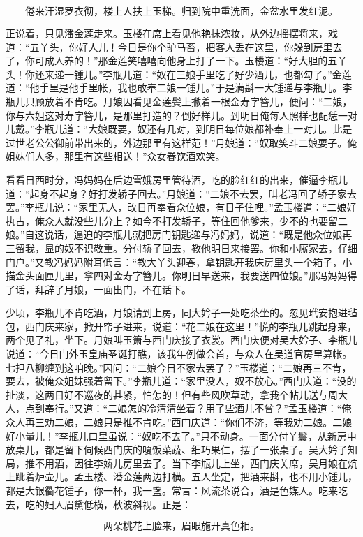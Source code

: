 \[
倦来汗湿罗衣彻，楼上人扶上玉梯。
归到院中重洗面，金盆水里发红泥。
\]

正说着，只见潘金莲走来。玉楼在席上看见他艳抹浓妆，从外边摇摆将来，戏道：“五丫头，你好人儿！今日是你个驴马畜，把客人丢在这里，你躲到房里去了，你可成人养的！”那金莲笑嘻嘻向他身上打了一下。玉楼道：“好大胆的五丫头！你还来递一锺儿。”李瓶儿道：“奴在三娘手里吃了好少酒儿，也都勾了。”金莲道：“他手里是他手里帐，我也敢奉二娘一锺儿。”于是满斟一大锺递与李瓶儿。李瓶儿只顾放着不肯吃。月娘因看见金莲鬓上撇着一根金寿字簪儿，便问：“二娘，你与六姐这对寿字簪儿，是那里打造的？倒好样儿。到明日俺每人照样也配恁一对儿戴。”李瓶儿道：“大娘既要，奴还有几对，到明日每位娘都补奉上一对儿。此是过世老公公御前带出来的，外边那里有这样范！”月娘道：“奴取笑斗二娘耍子。俺姐妹们人多，那里有这些相送！”众女眷饮酒欢笑。

看看日西时分，冯妈妈在后边雪娥房里管待酒，吃的脸红红的出来，催逼李瓶儿道：“起身不起身？好打发轿子回去。”月娘道：“二娘不去罢，叫老冯回了轿子家去罢。”李瓶儿说：“家里无人，改日再奉看众位娘，有日子住哩。”孟玉楼道：“二娘好执古，俺众人就没些儿分上？如今不打发轿子，等住回他爹来，少不的也要留二娘。”自这说话，逼迫的李瓶儿就把房门钥匙递与冯妈妈，说道：“既是他众位娘再三留我，显的奴不识敬重。分付轿子回去，教他明日来接罢。你和小厮家去，仔细门户。”又教冯妈妈附耳低言：“教大丫头迎春，拿钥匙开我床房里头一个箱子，小描金头面匣儿里，拿四对金寿字簪儿。你明日早送来，我要送四位娘。”那冯妈妈得了话，拜辞了月娘，一面出门，不在话下。

少顷，李瓶儿不肯吃酒，月娘请到上房，同大妗子一处吃茶坐的。忽见玳安抱进毡包，西门庆来家，掀开帘子进来，说道：“花二娘在这里！”慌的李瓶儿跳起身来，两个见了礼，坐下。月娘叫玉箫与西门庆接了衣裳。西门庆便对吴大妗子、李瓶儿说道：“今日门外玉皇庙圣诞打醮，该我年例做会首，与众人在吴道官房里算帐。七担八柳缠到这咱晚。”因问：“二娘今日不家去罢了？”玉楼道：“二娘再三不肯，要去，被俺众姐妹强着留下。”李瓶儿道：“家里没人，奴不放心。”西门庆道：“没的扯淡，这两日好不巡夜的甚紧，怕怎的！但有些风吹草动，拿我个帖儿送与周大人，点到奉行。”又道：“二娘怎的冷清清坐着？用了些酒儿不曾？”孟玉楼道：“俺众人再三劝二娘，二娘只是推不肯吃。”西门庆道：“你们不济，等我劝二娘。二娘好小量儿！”李瓶儿口里虽说：“奴吃不去了。”只不动身。一面分付丫鬟，从新房中放桌儿，都是留下伺候西门庆的嗄饭菜蔬、细巧果仁，摆了一张桌子。吴大妗子知局，推不用酒，因往李娇儿房里去了。当下李瓶儿上坐，西门庆关席，吴月娘在炕上跐着炉壶儿。孟玉楼、潘金莲两边打横。五人坐定，把酒来斟，也不用小锺儿，都是大银衢花锺子，你一杯，我一盏。常言：风流茶说合，酒是色媒人。吃来吃去，吃的妇人眉黛低横，秋波斜视。正是：

\[
两朵桃花上脸来，眉眼施开真色相。
\]

